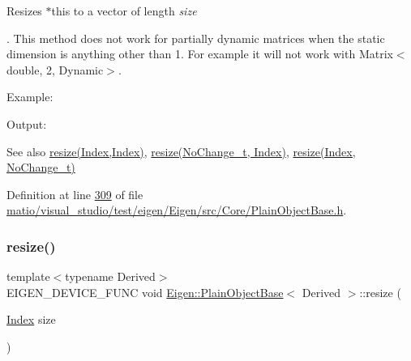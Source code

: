 Resizes {\ttfamily $\ast$this} to a vector of length {\itshape size} 

. This method does not work for partially dynamic matrices when the static dimension is anything other than 1. For example it will not work with Matrix$<$double, 2, Dynamic$>$.

Example\+: 
\begin{DoxyCodeInclude}
\end{DoxyCodeInclude}
 Output\+: 
\begin{DoxyVerbInclude}
\end{DoxyVerbInclude}


\begin{DoxySeeAlso}{See also}
\hyperlink{class_eigen_1_1_plain_object_base_a99d9054ee2d5a40c6e00ded0265e9cea}{resize(\+Index,\+Index)}, \hyperlink{class_eigen_1_1_plain_object_base_ab71a655f73d05a0e389e3ed13b6fe5f3}{resize(\+No\+Change\+\_\+t, Index)}, \hyperlink{class_eigen_1_1_plain_object_base_a7b44761b7350ae3756035bbf7d7c04f6}{resize(\+Index, No\+Change\+\_\+t)} 
\end{DoxySeeAlso}


Definition at line \hyperlink{matio_2visual__studio_2test_2eigen_2_eigen_2src_2_core_2_plain_object_base_8h_source_l00309}{309} of file \hyperlink{matio_2visual__studio_2test_2eigen_2_eigen_2src_2_core_2_plain_object_base_8h_source}{matio/visual\+\_\+studio/test/eigen/\+Eigen/src/\+Core/\+Plain\+Object\+Base.\+h}.

\mbox{\label{class_eigen_1_1_plain_object_base_abf8a9ec07cd52a2cdabb527596f7ddd1}} 
\subsubsection{\texorpdfstring{resize()}{resize()}\hspace{0.1cm}{\footnotesize\ttfamily [4/8]}}
{\footnotesize\ttfamily template$<$typename Derived$>$ \\
E\+I\+G\+E\+N\+\_\+\+D\+E\+V\+I\+C\+E\+\_\+\+F\+U\+NC void \hyperlink{class_eigen_1_1_plain_object_base}{Eigen\+::\+Plain\+Object\+Base}$<$ Derived $>$\+::resize (\begin{DoxyParamCaption}\item[{\hyperlink{namespace_eigen_a62e77e0933482dafde8fe197d9a2cfde}{Index}}]{size }\end{DoxyParamCaption})\hspace{0.3cm}{\ttfamily [inline]}}

